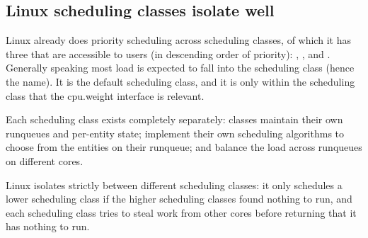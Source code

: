 \subsection{Linux scheduling classes isolate
well}\label{ss:approach:linux-classes-isolate}

Linux already does priority scheduling across scheduling classes, of which it
has three that are accessible to users (in descending order of priority):
\deadlineclass{}, \rtclass{}, and \normalclass{}. Generally speaking most load
is expected to fall into the \normalclass{} scheduling class (hence the name).
It is the default scheduling class, and it is only within the \normalclass{}
scheduling class that the \cgroups{} cpu.weight interface is relevant.

Each scheduling class exists completely separately: classes maintain their own
runqueues and per-entity state; implement their own scheduling algorithms to
choose from the entities on their runqueue; and balance the load across
runqueues on different cores. 

Linux isolates strictly between different scheduling classes: it only schedules
a lower scheduling class if the higher scheduling classes found nothing to run,
and each scheduling class tries to steal work from other cores before returning
that it has nothing to run.

